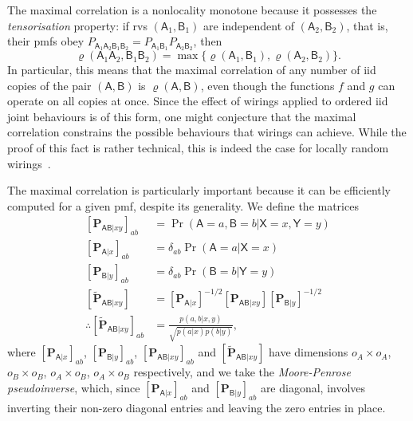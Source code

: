 \documentclass[10pt, a4paper]{article}
\numberwithin{equation}{section} %
\theoremstyle{definition}
\theoremstyle{plain}
\newcommand{\?}{\mathrel{?}} %
\newcommand{\matr}[2][]{\left[\mathbf{#2}#1\right]} %
\newcommand{\crv}[1]{\mathsf{#1}}
\begin{document}
                        The maximal correlation is a nonlocality monotone because it possesses the \emph{tensorisation} property: if rvs \((\crv{A}_1, \crv{B}_1)\) are independent of \((\crv{A}_2,\crv{B}_2)\), that is, their pmfs obey \(P_{\crv{A}_1\crv{A}_2\crv{B}_1\crv{B}_2} = P_{\crv{A}_1\crv{B}_1}P_{\crv{A}_2\crv{B}_2}\), then~\cite[Cor. 4.i]{NLMonotones}
                        \begin{equation}
                          \varrho(\crv{A}_1\crv{A}_2,\crv{B}_1\crv{B}_2) = \max\{ \varrho(\crv{A}_1,\crv{B}_1), \varrho(\crv{A}_2,\crv{B}_2) \}.
                        \end{equation}
                        In particular, this means that the maximal correlation of any number of iid copies of the pair \((\crv{A},\crv{B})\) is \(\varrho(\crv{A},\crv{B})\), even though the functions \(f\) and \(g\) can operate on all copies at once. Since the effect of wirings applied to ordered iid joint behaviours is of this form, one might conjecture that the maximal correlation constrains the possible behaviours that wirings can achieve. While the proof of this fact is rather technical, this is indeed the case for locally random wirings~\cite[Thm 8]{NLMonotones}. 

                        The maximal correlation is particularly important because it can be efficiently computed for a given pmf, despite its generality. We define the matrices
                        \begin{align}
                          \matr[_{\crv{AB}|xy}]{P}_{ab} &= \Pr(\crv{A} = a, \crv{B} = b|\crv{X} = x, \crv{Y} = y) \\
                          \matr[_{\crv{A}|x}]{P}_{ab} &= \delta_{ab} \Pr(\crv{A} = a|\crv{X} = x) \\
                          \matr[_{\crv{B}|y}]{P}_{ab} &= \delta_{ab} \Pr(\crv{B} = b|\crv{Y} = y) \\
                          \matr[_{\crv{AB}|xy}]{\tilde{P}} &= \matr[_{\crv{A}|x}]{P}^{-1/2} \matr[_{\crv{AB}|xy}]{P} \matr[_{\crv{B}|y}]{P}^{-1/2} \\
                          \therefore \matr[_{\crv{AB}|xy}]{\tilde{P}}_{ab} &= \frac{p(a,b|x,y)}{\sqrt{p(a|x)p(b|y)}},
                        \end{align}
                        where \(\matr[_{\crv{A}|x}]{P}_{ab}\), \(\matr[_{\crv{B}|y}]{P}_{ab}\), \(\matr[_{\crv{AB}|xy}]{P}_{ab}\) and \(\matr[_{\crv{AB}|xy}]{\tilde{P}}\) have dimensions \(o_A \times o_A\), \(o_B \times o_B\), \(o_A \times o_B\), \(o_A \times o_B\) respectively, and we take the \emph{Moore-Penrose pseudoinverse}, which, since \(\matr[_{\crv{A}|x}]{P}_{ab}\) and \(\matr[_{\crv{B}|y}]{P}_{ab}\) are diagonal, involves inverting their non-zero diagonal entries and leaving the zero entries in place.
\end{document}
